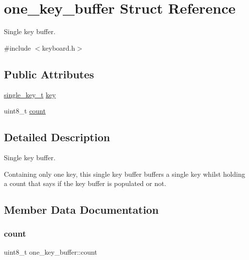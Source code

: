 \hypertarget{structone__key__buffer}{}\section{one\+\_\+key\+\_\+buffer Struct Reference}
\label{structone__key__buffer}


Single key buffer.  




{\ttfamily \#include $<$keyboard.\+h$>$}

\subsection*{Public Attributes}
\begin{DoxyCompactItemize}
\item 
\hyperlink{keyboard_8h_aa504c5d09bf7cea600b72b6003a8772c}{single\+\_\+key\+\_\+t} \hyperlink{structone__key__buffer_a8fafce124e38ced389393c68c1719c62}{key}
\item 
uint8\+\_\+t \hyperlink{structone__key__buffer_af56652a957a49467fb8aa65a5e03f372}{count}
\end{DoxyCompactItemize}


\subsection{Detailed Description}
Single key buffer. 

Containing only one key, this single key buffer buffers a single key whilst holding a count that says if the key buffer is populated or not. 

\subsection{Member Data Documentation}
\mbox{\label{structone__key__buffer_af56652a957a49467fb8aa65a5e03f372}} 
\subsubsection{\texorpdfstring{count}{count}}
{\footnotesize\ttfamily uint8\+\_\+t one\+\_\+key\+\_\+buffer\+::count}

\mbox{\label{structone__key__buffer_a8fafce124e38ced389393c68c1719c62}} 

